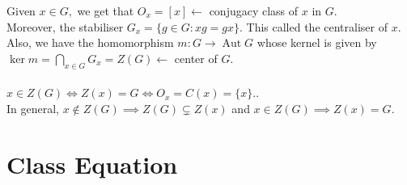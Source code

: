 \documentclass[12 pt, a4paper, toc=graduated, oneside]{article}
\theoremstyle{definition}
\newcommand{\Aut}{\operatorname{Aut}}
\begin{document}
Given $x \in G,$ we get that $O_x = [x] \longleftarrow$ conjugacy class of $x$ in $G.$\\
Moreover, the stabiliser $G_x = \{g \in G : xg = gx\}.$ This called the centraliser of $x.$\\
Also, we have the homomorphism $m : G \to \Aut G$ whose kernel is given by $\ker m = \displaystyle\bigcap_{x \in G}G_x = Z(G) \longleftarrow$ center of $G.$\\~\\
$x \in Z(G) \iff Z(x) = G \iff O_x = C(x) = \{x\}.$.\\
In general, $x \notin Z(G) \implies Z(G) \subsetneq Z(x)$ and $x \in Z(G) \implies Z(x) = G.$

\section{Class Equation}
\end{document}

